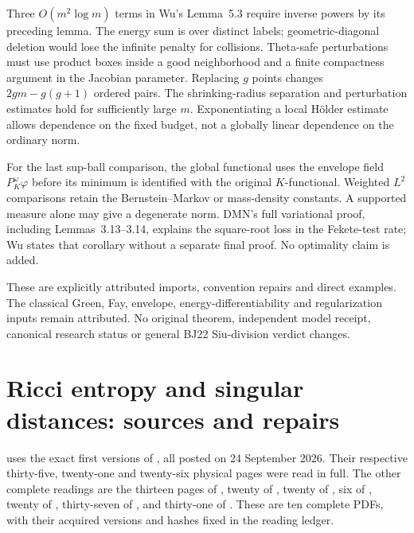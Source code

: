 Three $O(m^2\log m)$ terms in Wu's Lemma~5.3 require inverse
powers by its preceding lemma. The energy sum is over
distinct labels; geometric-diagonal deletion would lose
the infinite penalty for collisions. Theta-safe perturbations
must use product boxes inside a good neighborhood and a
finite compactness argument in the Jacobian parameter.
Replacing $g$ points changes $2gm-g(g+1)$ ordered pairs.
The shrinking-radius separation and perturbation estimates
hold for sufficiently large $m$. Exponentiating a local
H\"older estimate allows dependence on the fixed budget,
not a globally linear dependence on the ordinary norm.

For the last sup-ball comparison, the global functional
uses the envelope field $P_K^\omega\varphi$ before its
minimum is identified with the original $K$-functional.
Weighted $L^2$ comparisons retain the Bernstein--Markov or
mass-density constants. A supported measure alone may give
a degenerate norm. DMN's full variational proof, including
Lemmas~3.13--3.14, explains the square-root loss in the
Fekete-test rate; Wu states that corollary without a separate
final proof. No optimality claim is added.

These are explicitly attributed imports, convention repairs
and direct examples. The classical Green, Fay, envelope,
energy-differentiability and regularization inputs remain
attributed. No original theorem, independent model receipt,
canonical research status or general BJ22 Siu-division
verdict changes.

\section{Ricci entropy and singular distances: sources and repairs}
\label{sec:appL-ricci-entropy-sources}

 uses the exact first versions of
\cite{GSS26RicciEntropyV1,GSS26GeometricHolderV1,GSS26GeometricStabilityV1},
all posted on 24 September 2026. Their respective thirty-five,
twenty-one and twenty-six physical pages were read in full.
The other complete readings are the thirteen pages of
\cite{EGZ13ContinuousApproximationV1}, twenty of
\cite{Honda18AlmostSmoothV3}, twenty of
\cite{CCHSTT25CurrentsV1}, six of
\cite{EGZ16ViscosityErratumV1}, twenty of
\cite{ChoChoi25ContinuityV2}, thirty-seven of
\cite{GLZ17EnvelopesV1}, and thirty-one of
\cite{GKSS25HolderV1}. These are ten complete PDFs, with
their acquired versions and hashes fixed in the reading ledger.

